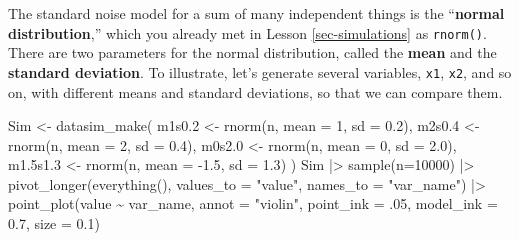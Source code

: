 \documentclass[
  letterpaper,
  DIV=11,
  numbers=noendperiod,
  oneside]{scrartcl}
\newenvironment{Shaded}{\begin{snugshade}}{\end{snugshade}}
\newcommand{\AttributeTok}[1]{\textcolor[rgb]{0.40,0.45,0.13}{#1}}
\newcommand{\DecValTok}[1]{\textcolor[rgb]{0.68,0.00,0.00}{#1}}
\newcommand{\FloatTok}[1]{\textcolor[rgb]{0.68,0.00,0.00}{#1}}
\newcommand{\FunctionTok}[1]{\textcolor[rgb]{0.28,0.35,0.67}{#1}}
\newcommand{\NormalTok}[1]{\textcolor[rgb]{0.00,0.23,0.31}{#1}}
\newcommand{\OtherTok}[1]{\textcolor[rgb]{0.00,0.23,0.31}{#1}}
\newcommand{\SpecialCharTok}[1]{\textcolor[rgb]{0.37,0.37,0.37}{#1}}
\newcommand{\StringTok}[1]{\textcolor[rgb]{0.13,0.47,0.30}{#1}}
\begin{document}
The standard noise model for a sum of many independent things is the
``\textbf{normal distribution},'' which you already met in Lesson
\ref{sec-simulations} as \texttt{rnorm()}. There are two parameters for
the normal distribution, called the \textbf{mean} and the
\textbf{standard deviation}. To illustrate, let's generate several
variables, \texttt{x1}, \texttt{x2}, and so on, with different means and
standard deviations, so that we can compare them.

\begin{Shaded}
\begin{Highlighting}[]
\NormalTok{Sim }\OtherTok{\textless{}{-}} \FunctionTok{datasim\_make}\NormalTok{(}
\NormalTok{  m1s0}\FloatTok{.2} \OtherTok{\textless{}{-}} \FunctionTok{rnorm}\NormalTok{(n, }\AttributeTok{mean =} \DecValTok{1}\NormalTok{, }\AttributeTok{sd =} \FloatTok{0.2}\NormalTok{),}
\NormalTok{  m2s0}\FloatTok{.4} \OtherTok{\textless{}{-}} \FunctionTok{rnorm}\NormalTok{(n, }\AttributeTok{mean =} \DecValTok{2}\NormalTok{, }\AttributeTok{sd =} \FloatTok{0.4}\NormalTok{),}
\NormalTok{  m0s2}\FloatTok{.0} \OtherTok{\textless{}{-}} \FunctionTok{rnorm}\NormalTok{(n, }\AttributeTok{mean =} \DecValTok{0}\NormalTok{, }\AttributeTok{sd =} \FloatTok{2.0}\NormalTok{),}
\NormalTok{  m1}\FloatTok{.5}\NormalTok{s1}\FloatTok{.3} \OtherTok{\textless{}{-}} \FunctionTok{rnorm}\NormalTok{(n, }\AttributeTok{mean =} \SpecialCharTok{{-}}\FloatTok{1.5}\NormalTok{, }\AttributeTok{sd =} \FloatTok{1.3}\NormalTok{)}
\NormalTok{)}
\NormalTok{Sim }\SpecialCharTok{|\textgreater{}} \FunctionTok{sample}\NormalTok{(}\AttributeTok{n=}\DecValTok{10000}\NormalTok{) }\SpecialCharTok{|\textgreater{}} 
  \FunctionTok{pivot\_longer}\NormalTok{(}\FunctionTok{everything}\NormalTok{(), }\AttributeTok{values\_to =} \StringTok{"value"}\NormalTok{, }\AttributeTok{names\_to =} \StringTok{"var\_name"}\NormalTok{) }\SpecialCharTok{|\textgreater{}}
  \FunctionTok{point\_plot}\NormalTok{(value }\SpecialCharTok{\textasciitilde{}}\NormalTok{ var\_name, }\AttributeTok{annot =} \StringTok{"violin"}\NormalTok{,}
             \AttributeTok{point\_ink =}\NormalTok{ .}\DecValTok{05}\NormalTok{, }\AttributeTok{model\_ink =} \FloatTok{0.7}\NormalTok{, }\AttributeTok{size =} \FloatTok{0.1}\NormalTok{)}
\end{Highlighting}
\end{Shaded}
\end{document}
